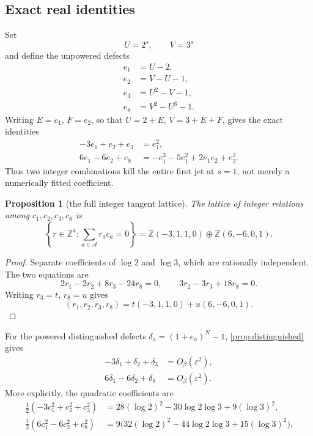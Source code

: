 \documentclass[11pt]{article}
\newtheorem{proposition}[theorem]{Proposition}
\theoremstyle{definition}
\theoremstyle{remark}
\newcommand{\ZZ}{\mathbb Z}
\newcommand{\eps}{\varepsilon}
\begin{document}
\subsection{Exact real identities}
Set
\[
U=2^s,\qquad V=3^s
\]
and define the unpowered defects
\begin{align*}
e_1&=U-2,\\
e_2&=V-U-1,\\
e_3&=U^2-V-1,\\
e_8&=V^2-U^3-1.
\end{align*}
Writing \(E=e_1\), \(F=e_2\), so that \(U=2+E\), \(V=3+E+F\), gives the exact identities
\begin{align}
-3e_1+e_2+e_3&=e_1^2,\label{eq:exact-tangent1}\\
6e_1-6e_2+e_8&=-e_1^3-5e_1^2+2e_1e_2+e_2^2.\label{eq:exact-tangent2}
\end{align}
Thus two integer combinations kill the entire first jet at \(s=1\), not merely a numerically fitted coefficient.

\begin{proposition}[the full integer tangent lattice]\label{prop:tangent-lattice}
The lattice of integer relations among \(c_1,c_2,c_3,c_8\) is
\begin{equation}\label{eq:tangent-lattice}
\left\{r\in\ZZ^4:\sum_{a\in\mathcal A}r_ac_a=0\right\}
=\ZZ(-3,1,1,0)\oplus\ZZ(6,-6,0,1).
\end{equation}
\end{proposition}

\begin{proof}
Separate coefficients of \(\log2\) and \(\log3\), which are rationally independent.  The two equations are
\[
2r_1-2r_2+8r_3-24r_8=0,
\qquad 3r_2-3r_3+18r_8=0.
\]
Writing \(r_3=t\), \(r_8=u\) gives
\[
(r_1,r_2,r_3,r_8)=t(-3,1,1,0)+u(6,-6,0,1).
\]
\end{proof}

For the powered distinguished defects \(\delta_a=(1+e_a)^N-1\), \cref{prop:distinguished} gives
\begin{align}
-3\delta_1+\delta_2+\delta_3&=O_\beta(\eps^2),\label{eq:powered-cancel1}\\
6\delta_1-6\delta_2+\delta_8&=O_\beta(\eps^2).
\label{eq:powered-cancel2}
\end{align}
More explicitly, the quadratic coefficients are
\begin{align*}
\frac12(-3c_1^2+c_2^2+c_3^2)
&=28(\log2)^2-30\log2\log3+9(\log3)^2,\\
\frac12(6c_1^2-6c_2^2+c_8^2)
&=9\bigl(32(\log2)^2-44\log2\log3+15(\log3)^2\bigr).
\end{align*}
\end{document}
